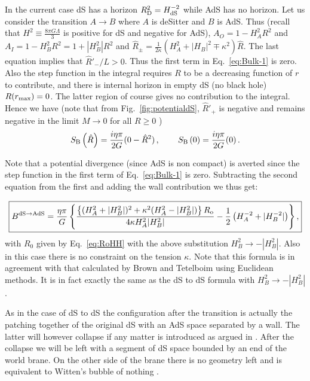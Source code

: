\documentclass[a4paper,11pt]{article}
\numberwithin{equation}{section}
\newcommand{\citep}{\cite}
\newcommand{\be}{\begin{equation}}
\newcommand{\ee}{\end{equation}}
\numberwithin{equation}{section}
\begin{document}
In the current case dS has a horizon $R_{{\rm D}}^{2}=H_{{\rm dS}}^{-2}$
while AdS has no horizon. Let us consider the transition $A\rightarrow B$
where $A$ is deSitter and $B$ is AdS. Thus (recall that $H^{2}\equiv\frac{8\pi G\Lambda}{3}$
is positive for dS and negative for AdS), $A_{O}=1-H_{A}^{2}R^{2}$
and $A_{I}=1-H_{B}^{2}R^{2}=1+|H_{B}^{2}|R^{2}$ and $\hat{R}_{\pm}=\frac{1}{2\kappa}\left(H_{A}^{2}+|H_{B}|^{2}\mp\kappa^{2}\right)\hat{R}$.
The last equation implies that $\hat{R}'_{-}/L>0$. Thus the first
term in Eq.~\eqref{eq:Bulk-1} is zero. Also the step function in the integral
requires $R$ to be a decreasing function of $r$ to contribute, and there is internal
horizon in empty dS (no black hole) $R(r_{\rm max})=0$.  The latter region  of course gives no contribution to the integral. Hence we have (note that from Fig.~\eqref{fig:potentialdS}, $\hat R'_+$ is negative and remains negative in the limit $M\rightarrow 0$ for all $R\geq 0$ )
\be
S_{{\rm B}}\left(\hat{R}\right)=\frac{i\eta\pi}{2G}(0-\hat{R}^{2})\,,\qquad \,S_{{\rm B}}\left(0\right)=\frac{i\eta\pi}{2G}(0) \,.
\ee

Note that a potential divergence (since AdS is non compact)  is averted since the step function in the first term of Eq.~\eqref{eq:Bulk-1} is zero.  Subtracting the second equation from the first and adding the wall contribution we thus get: 

\begin{equation}
\boxed{ 
B^{{\rm dS \rightarrow AdS}}=\frac{\eta\pi}{G}\left\{ \frac{\left\{ (H_{A}^{2}+|H_{B}^{2}|)^{2}+\kappa^{2}(H_{A}^{2}-|H_{B}^{2}|)\right\} R_{{\rm o}}}{4\kappa H_{A}^{2}|H_{B}^{2}|}-\frac{1}{2}\left(H_{A}^{-2}+|H_B^{-2}|\right)\right\} , }\label{eq:BdSAdS}
\end{equation}
with $R_{0}$ given by Eq.~\eqref{eq:RoHH} with the above substitution
$H_{B}^{2}\rightarrow-|H_{B}^{2}|$. Also in this case there is no
constraint on the tension $\kappa$. Note that this formula is in agreement with that calculated by Brown and Tetelboim using Euclidean methods. It is in fact exactly the same as the dS to dS formula with $H^2_B\rightarrow -|H^2_B|$.

As in the case of dS to dS the configuration after the transition
is actually the patching together of the original dS with an AdS
space separated by a wall. The latter will however collapse if any
matter is introduced as argued in \citep{Coleman:1980aw}. After the
collapse we will be left with a segment of dS space bounded by an
end of the world brane. On the other side of the brane there is no
geometry left and is equivalent to Witten's bubble of nothing \citep{Witten:1981gj}.
\end{document}
